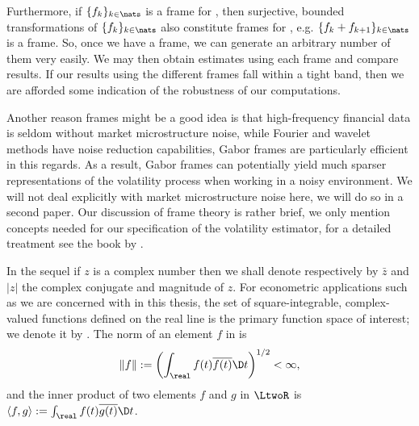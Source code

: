 Furthermore, if $\{f_k\}_{k \in \nats}$ is a frame for \hs, then surjective, bounded  transformations of $\{f_k\}_{k \in \nats}$  also constitute frames for \hs, e.g. $\{f_k + f_{k+1}\}_{k \in \nats}$ is a frame. So, once we have a frame, we can generate an arbitrary number of them very easily. We may then obtain estimates using each frame and compare results. If our results using the different frames fall within a tight band, then we are afforded some indication of the robustness of our computations.   


Another reason frames might be a good idea is that high-frequency financial data is seldom without market microstructure noise, while Fourier and wavelet methods have noise reduction capabilities, Gabor frames are particularly efficient in this regards. As a result, Gabor frames can potentially yield much sparser representations of the volatility process when working in a noisy environment.  We will not deal explicitly with market microstructure noise here, we will do so in a second paper.  Our discussion of  frame theory is rather brief, we only mention concepts needed for our specification of the volatility estimator, for a detailed treatment see the book by \cite{Christensen2008}. 

In the sequel if $z$ is a complex number then we shall denote respectively by $\bar{z}$ and $\vert z \vert$ the complex conjugate and magnitude of $z$. For econometric applications such as we are concerned with in this thesis, the set of square-integrable, complex-valued functions defined on the real line \real is the primary function space of interest; we denote it by \LtwoR. The norm of an element $f$ in \LtwoR is
\begin{align}
  \Vert f \Vert := \left(\int_\real f(t) \overline{f(t)} \D t\right)^{1/2} < \infty, \notag
  \label{}
\end{align}
 and the inner product of two elements $f$ and $g$ in $\LtwoR$ is $\langle f,g\rangle :=  \int_\real f(t) \overline{g(t)} \D t$.

